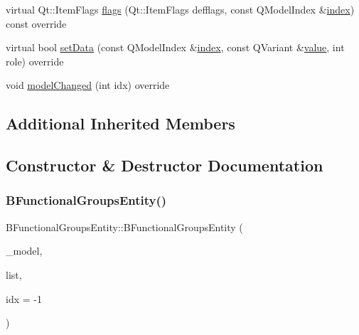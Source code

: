 \begin{DoxyCompactItemize}
\item 
virtual Qt\+::\+Item\+Flags \mbox{\hyperlink{classobjecttree_1_1_b_functional_groups_entity_aed532d8d49b107b7af8a57385963e94c}{flags}} (Qt\+::\+Item\+Flags defflags, const Q\+Model\+Index \&\mbox{\hyperlink{classobjecttree_1_1_b_functional_groups_entity_a52beb91ea69c7ee35ea1da3facc97196}{index}}) const override
\item 
virtual bool \mbox{\hyperlink{classobjecttree_1_1_b_functional_groups_entity_af7dc4283f3a5615166e159e2090fd8a0}{set\+Data}} (const Q\+Model\+Index \&\mbox{\hyperlink{classobjecttree_1_1_b_functional_groups_entity_a52beb91ea69c7ee35ea1da3facc97196}{index}}, const Q\+Variant \&\mbox{\hyperlink{diffusion_8cpp_a4b41795815d9f3d03abfc739e666d5da}{value}}, int role) override
\item 
void \mbox{\hyperlink{classobjecttree_1_1_b_functional_groups_entity_aa7b89957ec605a79278a3a26566d44fd}{model\+Changed}} (int idx) override
\end{DoxyCompactItemize}
\subsection*{Additional Inherited Members}


\subsection{Constructor \& Destructor Documentation}
\mbox{\label{classobjecttree_1_1_b_functional_groups_entity_ad5e9d6c77300cd75e91d6c3d55b715c4}} 
\subsubsection{\texorpdfstring{BFunctionalGroupsEntity()}{BFunctionalGroupsEntity()}}
{\footnotesize\ttfamily B\+Functional\+Groups\+Entity\+::\+B\+Functional\+Groups\+Entity (\begin{DoxyParamCaption}\item[{\mbox{\hyperlink{class_object_tree_model}{Object\+Tree\+Model}} $\ast$}]{\+\_\+model,  }\item[{std\+::shared\+\_\+ptr$<$ \mbox{\hyperlink{class_interesting_list_with_special_values}{Interesting\+List\+With\+Special\+Values}}$<$ int $>$$>$}]{list,  }\item[{int}]{idx = {\ttfamily -\/1} }\end{DoxyParamCaption})\hspace{0.3cm}{\ttfamily [explicit]}}



